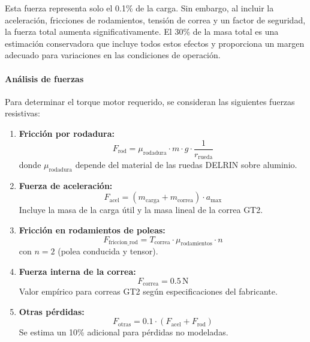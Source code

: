 Esta fuerza representa solo el 0.1\% de la carga. Sin embargo, al incluir la aceleración, fricciones de rodamientos, tensión de correa y un factor de seguridad, la fuerza total aumenta significativamente. El 30\% de la masa total es una estimación conservadora que incluye todos estos efectos y proporciona un margen adecuado para variaciones en las condiciones de operación.

\paragraph{Análisis de fuerzas}
Para determinar el torque motor requerido, se consideran las siguientes fuerzas resistivas:

\begin{enumerate}
    \item \textbf{Fricción por rodadura:}
    \begin{equation}
    F_{\text{rod}} = \mu_{\text{rodadura}} \cdot m \cdot g \cdot \frac{1}{r_{\text{rueda}}}
    \end{equation}
    donde $\mu_{\text{rodadura}}$ depende del material de las ruedas DELRIN sobre aluminio.
    
    \item \textbf{Fuerza de aceleración:}
    \begin{equation}
    F_{\text{acel}} = (m_{\text{carga}} + m_{\text{correa}}) \cdot a_{\text{max}}
    \end{equation}
    Incluye la masa de la carga útil y la masa lineal de la correa GT2.
    
    \item \textbf{Fricción en rodamientos de poleas:}
    \begin{equation}
    F_{\text{friccion\_rod}} = T_{\text{correa}} \cdot \mu_{\text{rodamientos}} \cdot n
    \end{equation}
    con $n = 2$ (polea conducida y tensor).
    
    \item \textbf{Fuerza interna de la correa:}
    \begin{equation}
    F_{\text{correa}} = 0.5\,\text{N}
    \end{equation}
    Valor empírico para correas GT2 según especificaciones del fabricante.
    
    \item \textbf{Otras pérdidas:}
    \begin{equation}
    F_{\text{otras}} = 0.1 \cdot (F_{\text{acel}} + F_{\text{rod}})
    \end{equation}
    Se estima un 10\% adicional para pérdidas no modeladas.
\end{enumerate}

